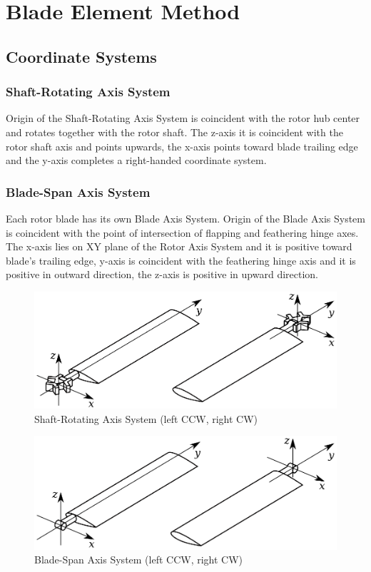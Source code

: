 \chapter{Blade Element Method}

\section{Coordinate Systems}

\subsection{Shaft-Rotating Axis System}

Origin of the Shaft-Rotating Axis System is coincident with the rotor hub center and rotates together with the rotor shaft. The z-axis it is coincident with the rotor shaft axis and points upwards, the x-axis points toward blade trailing edge and the y-axis completes a right-handed coordinate system.

\subsection{Blade-Span Axis System}

Each rotor blade has its own Blade Axis System. Origin of the Blade Axis System is coincident with the point of intersection of flapping and feathering hinge axes. The x-axis lies on XY plane of the Rotor Axis System and it is positive toward blade's trailing edge, y-axis is coincident with the feathering hinge axis and it is positive in outward direction, the z-axis is positive in upward direction.

\begin{figure}
  \centering
  \includegraphics[width=130mm]{eps/coordinate_system_SRAS.eps}
  \caption{Shaft-Rotating Axis System (left CCW, right CW)}
\end{figure}

\begin{figure}
  \centering
  \includegraphics[width=130mm]{eps/coordinate_system_BSAS.eps}
  \caption{Blade-Span Axis System (left CCW, right CW)}
\end{figure}

